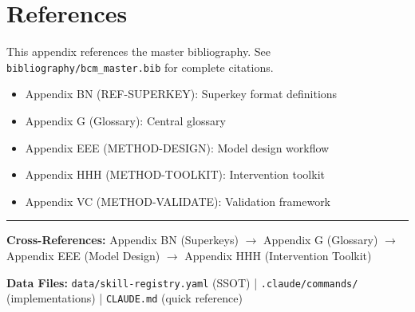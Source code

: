 
\section{References}
\label{sec:sk-references}

This appendix references the master bibliography. See \texttt{bibliography/bcm\_master.bib}
for complete citations.

\nocite{bcm_master}

\begin{itemize}
\item Appendix BN (REF-SUPERKEY): Superkey format definitions
\item Appendix G (Glossary): Central glossary
\item Appendix EEE (METHOD-DESIGN): Model design workflow
\item Appendix HHH (METHOD-TOOLKIT): Intervention toolkit
\item Appendix VC (METHOD-VALIDATE): Validation framework
\end{itemize}


\vfill
\hrule
\vspace{0.5em}
\small
\textbf{Cross-References:}
Appendix BN (Superkeys) $\rightarrow$
Appendix G (Glossary) $\rightarrow$
Appendix EEE (Model Design) $\rightarrow$
Appendix HHH (Intervention Toolkit)

\textbf{Data Files:}
\texttt{data/skill-registry.yaml} (SSOT) |
\texttt{.claude/commands/} (implementations) |
\texttt{CLAUDE.md} (quick reference)

\normalsize
